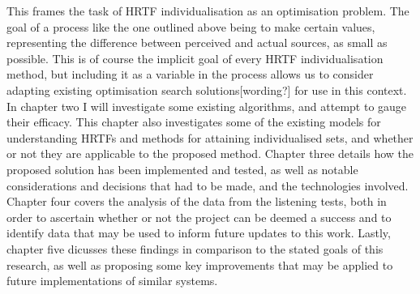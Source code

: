 This frames the task of HRTF individualisation as an optimisation problem. The goal of a process like the one outlined above being to make certain values, representing the difference between perceived and actual sources, as small as possible. This is of course the implicit goal of every HRTF individualisation method, but including it as a variable in the process allows us to consider adapting existing optimisation search solutions[wording?] for use in this context. In chapter two I will investigate some existing algorithms, and attempt to gauge their efficacy. This chapter also investigates some of the existing models for understanding HRTFs and methods for attaining individualised sets, and whether or not they are applicable to the proposed method. Chapter three details how the proposed solution has been implemented and tested, as well as notable considerations and decisions that had to be made, and the technologies involved. Chapter four covers the analysis of the data from the listening tests, both in order to ascertain whether or not the project can be deemed a success and to identify data that may be used to inform future updates to this work. Lastly, chapter five dicusses these findings in comparison to the stated goals of this research, as well as proposing some key improvements that may be applied to future implementations of similar systems. 




